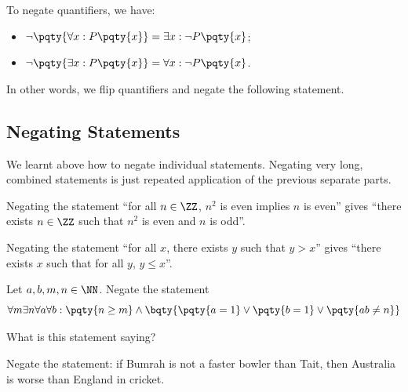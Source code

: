 \documentclass{article}
\begin{document}
To negate quantifiers, we have:
\begin{itemize}
    \item \(\lnot \pqty{\forall x: P\pqty{x}} = \exists x: \lnot P\pqty{x}\);
    \item \(\lnot \pqty{\exists x: P\pqty{x}} = \forall x: \lnot P\pqty{x}\).
\end{itemize}

In other words, we flip quantifiers and negate the following statement.

\subsection{Negating Statements}

We learnt above how to negate individual statements. Negating very long, combined statements is just repeated application of the previous separate parts.

\begin{example}
    Negating the statement ``for all \(n \in \ZZ\), \(n^2\) is even implies \(n\) is even'' gives ``there exists \(n \in \ZZ\) such that \(n^2\) is even and \(n\) is odd''.

    Negating the statement ``for all \(x\), there exists \(y\) such that \(y > x\)'' gives ``there exists \(x\) such that for all \(y\), \(y \leq x\)''.
\end{example}

\begin{example}
    Let \(a, b, m, n \in \NN\). Negate the statement
    \[
        \forall m \exists n \forall a \forall b: \pqty{n \geq m} \land \bqty{\pqty{a = 1} \lor \pqty{b = 1} \lor \pqty{ab \neq n}}
    \]
\end{example}

\begin{problem}
    What is this statement saying?
\end{problem}

\begin{example}
    Negate the statement: if Bumrah is not a faster bowler than Tait, then Australia is worse than England in cricket.
\end{example}
\end{document}
